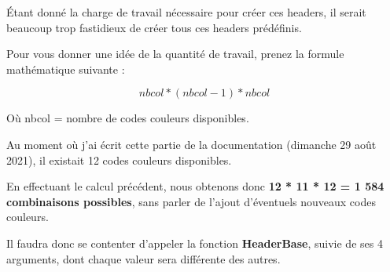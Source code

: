 \documentclass[a4paper,10pt]{article}
\begin{document}
\begin{justify}
    Étant donné la charge de travail nécessaire pour créer ces headers, il serait beaucoup trop fastidieux de créer tous ces headers prédéfinis.
\end{justify}

\begin{justify}
    Pour vous donner une idée de la quantité de travail, prenez la formule mathématique suivante :
\end{justify}

\[nbcol * (nbcol - 1) * nbcol\]

\begin{justify}
    Où nbcol = nombre de codes couleurs disponibles.
\end{justify}

\begin{justify}
    Au moment où j'ai écrit cette partie de la documentation (dimanche 29 août 2021), il existait 12 codes couleurs disponibles.
\end{justify}

\begin{justify}
    En effectuant le calcul précédent, nous obtenons donc \textbf{12 * 11 * 12 = 1 584 combinaisons possibles}, sans parler de l'ajout d'éventuels nouveaux codes couleurs.
\end{justify}

\begin{justify}
    Il faudra donc se contenter d'appeler la fonction \textbf{\color{mauve}HeaderBase}, suivie de ses 4 arguments, dont chaque valeur sera différente des autres.
\end{justify}
\end{document}
